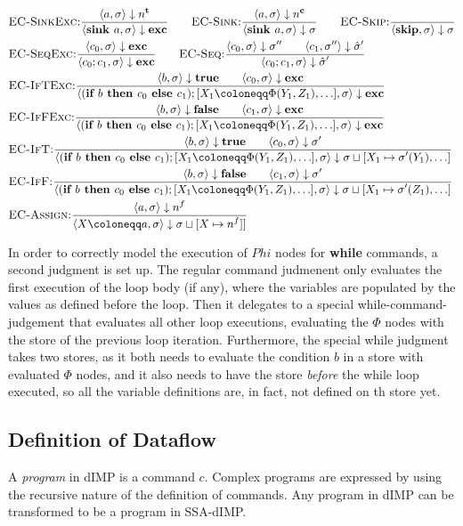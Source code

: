 \begin{align*}
    &\bsrule{EC-SinkExc}{\bigstep{a}{\store}{\tracked{}}}
    {\bigstep{\defaultsink}{\store}{\exception}} \qquad
    \bsrule{EC-Sink}{\bigstep{a}{\store}{\clean{}}}
    {\bigstep{\defaultsink}{\store}{\store}} \qquad
    \bsrule{EC-Skip}{}{\bigstep{\skipcmd}{\store}{\store}}\\
    &\bsrule{EC-SeqExc}{\bigstep{c_0}{\sigma}{\exception}}
    {\bigstep{\defaultseq}{\store}{\exception}} \qquad
    \bsrule{EC-Seq}{\bigstep{c_0}{\sigma}{\store''} \qquad \bigstep{c_1}{\store''}{\excstore'}}
    {\bigstep{\defaultseq}{\store}{\excstore'}}\\
    &\bsrule{EC-IfTExc}{\bigstep{b}{\store}{\btrue}\qquad \bigstep{c_0}{\store}{\exception}}
    {\bigstep{\defaultssaif}{\store}{\exception}}\\
    &\bsrule{EC-IfFExc}{\bigstep{b}{\store}{\bfalse}\qquad \bigstep{c_1}{\store}{\exception}}
    {\bigstep{\defaultssaif}{\store}{\exception}}\\
    &\bsrule{EC-IfT}{\bigstep{b}{\store}{\btrue}\qquad \bigstep{c_0}{\store}{\store'}}
    {\bigstep{\defaultssaif}{\store}{\leftstoreassign{\store}{\store'} }}\\
    &\bsrule{EC-IfF}{\bigstep{b}{\store}{\bfalse}\qquad \bigstep{c_1}{\store}{\store'}}
    {\bigstep{\defaultssaif}{\store}{\rightstoreassign{\store}{\store'} }}\\
    &\bsrule{EC-Assign}{\bigstep{a}{\store}{\flagged{}}}
    {\bigstep{\defaultstore}{\store}{\storeassign{\store}{X \mapsto \flagged{}]}}}\\
\end{align*}

In order to correctly model the execution of $Phi$ nodes for \textbf{while} commands,
a second judgment is set up.
The regular command judmenent only evaluates the first execution of the loop body
(if any), where the variables are populated by the values as defined before the loop.
Then it delegates to a special while-command-judgement that evaluates all other 
loop executions, evaluating the $\Phi$ nodes with the store of the previous loop 
iteration.
Furthermore, the special while judgment takes two stores, as it both needs to evaluate
the condition $b$ in a store with evaluated $\Phi$ nodes, and it also needs to have
the store \emph{before} the while loop executed, so all the variable definitions are,
in fact, not defined on th store yet.


\subsection{Definition of Dataflow}
\begin{definition}[Program]
    A \emph{program} in dIMP is a command $c$.
    Complex programs are expressed by using the recursive nature of
    the definition of commands.
    Any program in dIMP can be transformed to be a program in SSA-dIMP.
\end{definition}

